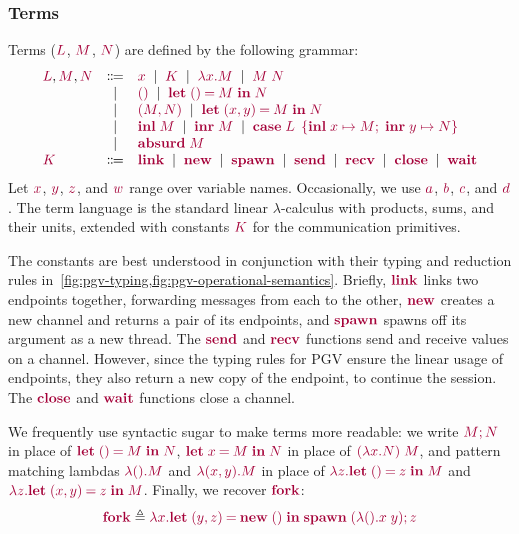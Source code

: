 \documentclass[main.tex]{subfiles}
\begin{document}
\subsubsection*{Terms}
Terms ($\tm{L}$, $\tm{M}$, $\tm{N}$) are defined by the following grammar:
\[
\begin{array}{lcl}
  \tm{L}, \tm{M}, \tm{N}
  & \Coloneqq & \tm{x}
    \sep        \tm{K}
    \sep        \tm{\lambda x.M}
    \sep        \tm{M\;N} \\
  & \sep      & \tm{\unit}
    \sep        \tm{\letunit{M}{N}} \\
  & \sep      & \tm{\pair{M}{N}}
    \sep        \tm{\letpair{x}{y}{M}{N}} \\
  & \sep      & \tm{\inl{M}}
    \sep        \tm{\inr{M}}
    \sep        \tm{\casesum{L}{x}{M}{y}{N}} \\
  & \sep      & \tm{\absurd{M}} \\
  \tm{K}
  & \Coloneqq & \tm{\link}
    \sep        \tm{\new}
    \sep        \tm{\spawn}
    \sep        \tm{\send}
    \sep        \tm{\recv}
    \sep        \tm{\close}
    \sep        \tm{\wait}
\end{array}
\]
Let $\tm{x}$, $\tm{y}$, $\tm{z}$, and $\tm{w}$ range over variable names. Occasionally, we use $\tm{a}$, $\tm{b}$, $\tm{c}$, and $\tm{d}$. The term language is the standard linear $\lambda$-calculus with products, sums, and their units, extended with constants $\tm{K}$ for the communication primitives. 

The constants are best understood in conjunction with their typing and reduction rules in~\cref{fig:pgv-typing,fig:pgv-operational-semantics}. Briefly, $\tm{\link}$ links two endpoints together, forwarding messages from each to the other, $\tm{\new}$ creates a new channel and returns a pair of its endpoints, and $\tm{\spawn}$ spawns off its argument as a new thread. The $\tm{\send}$ and $\tm{\recv}$ functions send and receive values on a channel. However, since the typing rules for PGV ensure the linear usage of endpoints, they also return a new copy of the endpoint, to continue the session. The $\tm{\close}$ and $\tm{\wait}$ functions close a channel.

We frequently use syntactic sugar to make terms more readable: we write $\tm{\andthen{M}{N}}$ in place of $\tm{\letunit{M}{N}}$, $\tm{\letbind{x}{M}{N}}$ in place of $\tm{(\lambda x.N)\;M}$, and pattern matching lambdas $\tm{\lambda\unit.M}$ and $\tm{\lambda\pair{x}{y}.M}$ in place of $\tm{\lambda z.\letunit{z}{M}}$ and $\tm{\lambda z.\letpair{x}{y}{z}{M}}$. Finally, we recover $\tm{\fork}$:
\[
  \tm{\fork} \defeq \tm{\lambda x.\letpair{y}{z}{\new\;\unit}{\andthen{\spawn\;{(\lambda\unit.x\;y)}}{z}}}
\]
\end{document}
